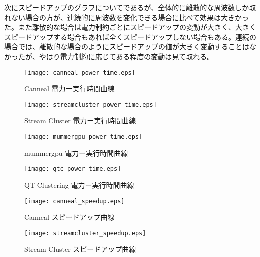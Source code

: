 次にスピードアップのグラフについてであるが、全体的に離散的な周波数しか取れない場合の方が、連続的に周波数を変化できる場合に比べて効果は大きかった。また離散的な場合は電力制約ごとにスピードアップの変動が大きく、大きくスピードアップする場合もあれば全くスピードアップしない場合もある。連続の場合では、離散的な場合のようにスピードアップの値が大きく変動することはなかったが、やはり電力制約に応じてある程度の変動は見て取れる。

\begin{figure}[t]
 \begin{center}
  \texttt{[image: canneal\_power\_time.eps]}
 \end{center}
 \caption{Canneal 電力ー実行時間曲線}
 \label{fig:canneal_power_time}
\end{figure}

\begin{figure}[t]
 \begin{center}
  \texttt{[image: streamcluster\_power\_time.eps]}
 \end{center}
 \caption{Stream Cluster 電力ー実行時間曲線}
 \label{fig:streamcluster_power_time}
\end{figure}

\begin{figure}[t]
 \begin{center}
  \texttt{[image: mummergpu\_power\_time.eps]}
 \end{center}
 \caption{mummergpu 電力ー実行時間曲線}
 \label{fig:mummergpu_power_time}
\end{figure}

\begin{figure}[t]
 \begin{center}
  \texttt{[image: qtc\_power\_time.eps]}
 \end{center}
 \caption{QT Clustering 電力ー実行時間曲線}
 \label{fig:qtclustering_power_time}
\end{figure}

\begin{figure}[t]
 \begin{center}
  \texttt{[image: canneal\_speedup.eps]}
 \end{center}
 \caption{Canneal スピードアップ曲線}
 \label{fig:canneal_speedup}
\end{figure}

\begin{figure}[t]
 \begin{center}
  \texttt{[image: streamcluster\_speedup.eps]}
 \end{center}
 \caption{Stream Cluster スピードアップ曲線}
 \label{fig:streamcluster_speedup}
\end{figure}

